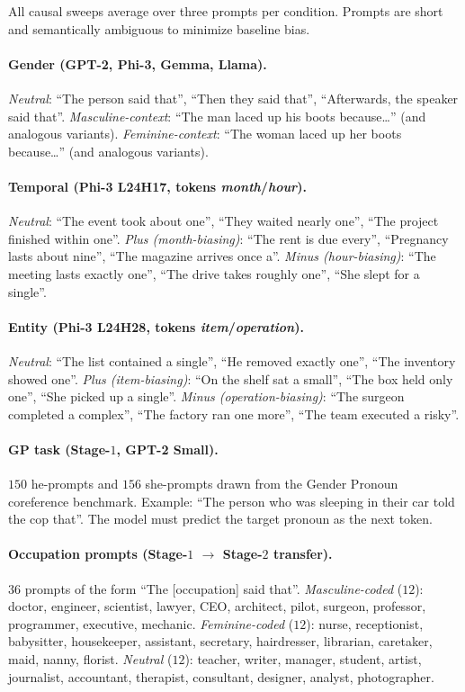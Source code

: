 All causal sweeps average over three prompts per condition.
Prompts are short and semantically ambiguous to minimize baseline
bias.

\paragraph{Gender (GPT-2, Phi-3, Gemma, Llama).}
\emph{Neutral}: ``The person said that'', ``Then they said
that'', ``Afterwards, the speaker said that''.
\emph{Masculine-context}: ``The man laced up his boots
because\ldots'' (and analogous variants).
\emph{Feminine-context}: ``The woman laced up her boots
because\ldots'' (and analogous variants).

\paragraph{Temporal (Phi-3 L24H17, tokens \emph{month}/\emph{hour}).}
\emph{Neutral}: ``The event took about one'', ``They waited
nearly one'', ``The project finished within one''.
\emph{Plus (month-biasing)}: ``The rent is due every'',
``Pregnancy lasts about nine'', ``The magazine arrives once
a''.
\emph{Minus (hour-biasing)}: ``The meeting lasts exactly one'',
``The drive takes roughly one'', ``She slept for a single''.

\paragraph{Entity (Phi-3 L24H28, tokens \emph{item}/\emph{operation}).}
\emph{Neutral}: ``The list contained a single'', ``He removed
exactly one'', ``The inventory showed one''.
\emph{Plus (item-biasing)}: ``On the shelf sat a small'', ``The
box held only one'', ``She picked up a single''.
\emph{Minus (operation-biasing)}: ``The surgeon completed a
complex'', ``The factory ran one more'', ``The team executed a
risky''.

\paragraph{GP task (Stage-$1$, GPT-2 Small).}
$150$ he-prompts and $156$ she-prompts drawn from the Gender
Pronoun coreference benchmark. Example: ``The person who was
sleeping in their car told the cop that''. The model must
predict the target pronoun as the next token.

\paragraph{Occupation prompts (Stage-$1$ $\to$ Stage-$2$ transfer).}
$36$ prompts of the form ``The [occupation] said that''.
\emph{Masculine-coded} ($12$): doctor, engineer, scientist,
lawyer, CEO, architect, pilot, surgeon, professor, programmer,
executive, mechanic. \emph{Feminine-coded} ($12$): nurse,
receptionist, babysitter, housekeeper, assistant, secretary,
hairdresser, librarian, caretaker, maid, nanny, florist.
\emph{Neutral} ($12$): teacher, writer, manager, student,
artist, journalist, accountant, therapist, consultant,
designer, analyst, photographer.

